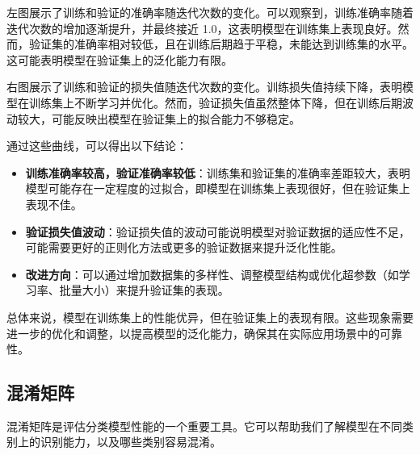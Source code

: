 左图展示了训练和验证的准确率随迭代次数的变化。可以观察到，训练准确率随着迭代次数的增加逐渐提升，并最终接近 1.0，这表明模型在训练集上表现良好。然而，验证集的准确率相对较低，且在训练后期趋于平稳，未能达到训练集的水平。这可能表明模型在验证集上的泛化能力有限。

右图展示了训练和验证的损失值随迭代次数的变化。训练损失值持续下降，表明模型在训练集上不断学习并优化。然而，验证损失值虽然整体下降，但在训练后期波动较大，可能反映出模型在验证集上的拟合能力不够稳定。

通过这些曲线，可以得出以下结论：
\begin{itemize}
    \item \textbf{训练准确率较高，验证准确率较低}：训练集和验证集的准确率差距较大，表明模型可能存在一定程度的过拟合，即模型在训练集上表现很好，但在验证集上表现不佳。
    \item \textbf{验证损失值波动}：验证损失值的波动可能说明模型对验证数据的适应性不足，可能需要更好的正则化方法或更多的验证数据来提升泛化性能。
    \item \textbf{改进方向}：可以通过增加数据集的多样性、调整模型结构或优化超参数（如学习率、批量大小）来提升验证集的表现。
\end{itemize}

总体来说，模型在训练集上的性能优异，但在验证集上的表现有限。这些现象需要进一步的优化和调整，以提高模型的泛化能力，确保其在实际应用场景中的可靠性。
\subsection{混淆矩阵}

混淆矩阵是评估分类模型性能的一个重要工具。它可以帮助我们了解模型在不同类别上的识别能力，以及哪些类别容易混淆。

